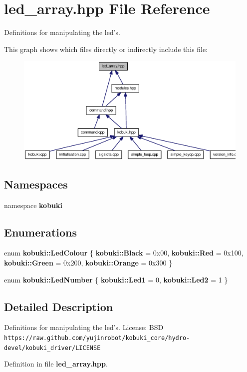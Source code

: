 \section{led\-\_\-array.\-hpp \-File \-Reference}
\label{led__array_8hpp}


\-Definitions for manipulating the led's.  


\-This graph shows which files directly or indirectly include this file\-:
\nopagebreak
\begin{figure}[H]
\begin{center}
\leavevmode
\includegraphics[width=350pt]{led__array_8hpp__dep__incl}
\end{center}
\end{figure}
\subsection*{\-Namespaces}
\begin{DoxyCompactItemize}
\item 
namespace {\bf kobuki}
\end{DoxyCompactItemize}
\subsection*{\-Enumerations}
\begin{DoxyCompactItemize}
\item 
enum {\bf kobuki\-::\-Led\-Colour} \{ {\bf kobuki\-::\-Black} =  0x00, 
{\bf kobuki\-::\-Red} =  0x100, 
{\bf kobuki\-::\-Green} =  0x200, 
{\bf kobuki\-::\-Orange} =  0x300
 \}
\item 
enum {\bf kobuki\-::\-Led\-Number} \{ {\bf kobuki\-::\-Led1} =  0, 
{\bf kobuki\-::\-Led2} =  1
 \}
\end{DoxyCompactItemize}


\subsection{\-Detailed \-Description}
\-Definitions for manipulating the led's. \-License\-: \-B\-S\-D {\tt https\-://raw.\-github.\-com/yujinrobot/kobuki\-\_\-core/hydro-\/devel/kobuki\-\_\-driver/\-L\-I\-C\-E\-N\-S\-E} 

\-Definition in file {\bf led\-\_\-array.\-hpp}.

